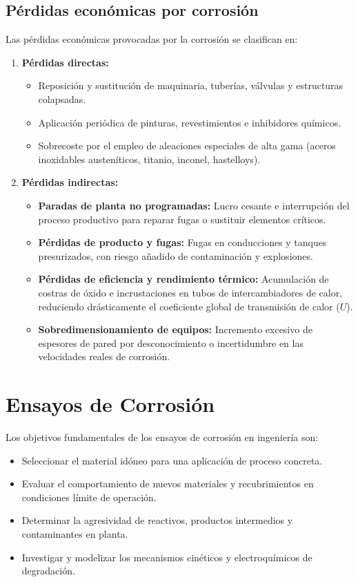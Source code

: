 \subsection{Pérdidas económicas por corrosión}
Las pérdidas económicas provocadas por la corrosión se clasifican en:
\begin{enumerate}
    \item \textbf{Pérdidas directas:}
          \begin{itemize}
              \item Reposición y sustitución de maquinaria, tuberías, válvulas y estructuras colapsadas.
              \item Aplicación periódica de pinturas, revestimientos e inhibidores químicos.
              \item Sobrecoste por el empleo de aleaciones especiales de alta gama (aceros inoxidables austeníticos, titanio, inconel, hastelloys).
          \end{itemize}
    \item \textbf{Pérdidas indirectas:}
          \begin{itemize}
              \item \textbf{Paradas de planta no programadas:} Lucro cesante e interrupción del proceso productivo para reparar fugas o sustituir elementos críticos.
              \item \textbf{Pérdidas de producto y fugas:} Fugas en conducciones y tanques presurizados, con riesgo añadido de contaminación y explosiones.
              \item \textbf{Pérdidas de eficiencia y rendimiento térmico:} Acumulación de costras de óxido e incrustaciones en tubos de intercambiadores de calor, reduciendo drásticamente el coeficiente global de transmisión de calor ($U$).
              \item \textbf{Sobredimensionamiento de equipos:} Incremento excesivo de espesores de pared por desconocimiento o incertidumbre en las velocidades reales de corrosión.
          \end{itemize}
\end{enumerate}

\section{Ensayos de Corrosión}

Los objetivos fundamentales de los ensayos de corrosión en ingeniería son:
\begin{itemize}
    \item Seleccionar el material idóneo para una aplicación de proceso concreta.
    \item Evaluar el comportamiento de nuevos materiales y recubrimientos en condiciones límite de operación.
    \item Determinar la agresividad de reactivos, productos intermedios y contaminantes en planta.
    \item Investigar y modelizar los mecanismos cinéticos y electroquímicos de degradación.
\end{itemize}

